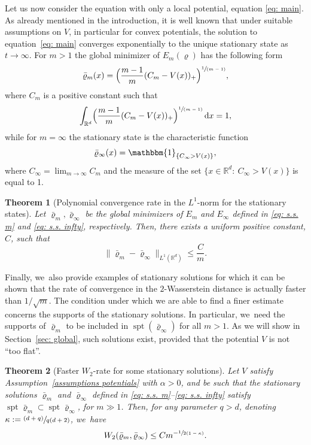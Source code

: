 \documentclass[10pt]{amsart}
\newcommand{\psfrac}[2]{\sfrac{(#1)}{#2}}
\newcommand{\spfrac}[2]{\sfrac{#1}{(#2)}}
\DeclareMathOperator{\spt}{spt}
\let\mathds\mathbbm
\newcommand{\Bprt}[1]{\Bigl(#1\Bigr)}
\newcommand{\dx}[1]{\mathop{}\!\mathrm{d} #1}
\newcommand{\R}{\mathbb{R}}
\theoremstyle{plain}
\newtheorem{theorem}{Theorem}[section]
\theoremstyle{remark}
\begin{document}
Let us now consider the equation with only a local potential, equation \eqref{eq: main}. As already mentioned in the introduction, it is well known that under suitable assumptions on $V$, in particular for convex potentials, the solution to equation~\eqref{eq: main} converges exponentially to the {unique} stationary state as $t\to\infty$. For $m>1$ the global minimizer of $E_m(\varrho)$ has the following form
\begin{equation}\label{eq: s.s. m}
\bar\varrho_m(x) = \Bprt{\frac{m-1}{m}(C_m - V(x))_+}^{\spfrac{1}{m-1}},
\end{equation}
where $C_m$ is a positive constant such that
\[
\int_{\R^d} \Bprt{\frac{m-1}{m}(C_m - V(x))_+}^{\spfrac{1}{m-1}} \dx x =1,
\]
while for $m=\infty$ the stationary state is the characteristic function
\begin{equation}\label{eq: s.s. infty}
\bar\varrho_\infty(x)=\mathds{1}_{\{C_\infty > V(x)\}},
\end{equation}
where $C_\infty=\lim_{m\to\infty}C_m$ and the measure of the set $\{x\in\R^d: \ C_\infty>V(x)\}$ is equal to 1.


\begin{theorem}[Polynomial {convergence} rate in the $L^1$-norm for the stationary states]\label{thm: L1 s.s.}
Let $\bar\varrho_m, \bar\varrho_\infty$ be the global minimizers of $E_m$ and $E_\infty$ defined in \eqref{eq: s.s. m} and \eqref{eq: s.s. infty}, respectively. Then, there exists a uniform positive constant, $C$, such that
\begin{equation*}
\|\bar\varrho_m- \bar\varrho_\infty\|_{L^1(\R^d)} \leq \frac{C}{{m}}.
\end{equation*}
\end{theorem}


Finally, we~also provide examples of stationary solutions for which it can be shown that the rate of convergence in the $2$-Wasserstein distance is actually faster than $1/\sqrt m$. The condition under which we are able to find a finer estimate concerns the supports of the stationary solutions. In particular, we~need the supports of $\bar\varrho_m$ to be included in $\spt (\bar\varrho_\infty)$ for all $m>1$. As we will show in Section~\ref{sec: global}, such solutions exist, provided that the potential $V$ is not ``too flat''.

\begin{theorem}[Faster $W_2$-rate for some stationary solutions]\label{prop: s.s. improved}
Let $V$ satisfy Assumption~\ref{assumptions potentials} with $\alpha>0$, and be such that the stationary solutions $\bar\varrho_m$ and $\bar\varrho_\infty$ defined in \eqref{eq: s.s. m}--\eqref{eq: s.s. infty} satisfy $\spt{\bar\varrho_m}\subset \spt{\bar\varrho_\infty}$, for $m\gg 1$. Then, for any parameter $q>d$, denoting $\kappa := \psfrac{d+q}{q(d+2)}$, we~have
\begin{equation}\label{eq: improved}
W_2(\bar\varrho_m,\bar\varrho_\infty) \leq {C}{m^{-\sfrac{1}{2(1-\kappa)}}}.
\end{equation}
\end{theorem}
\end{document}
